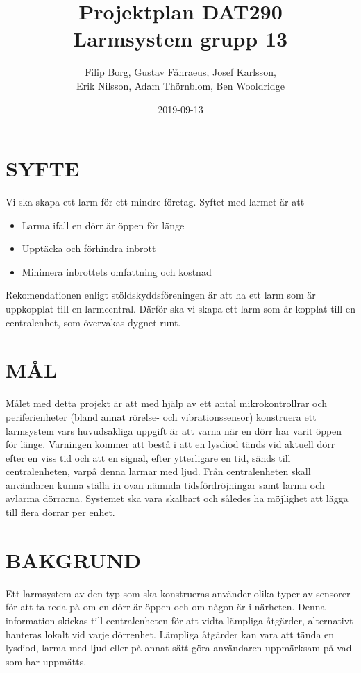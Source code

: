 \documentclass[a4paper]{article}
\title{Projektplan DAT290 \\ \Large Larmsystem grupp 13}
\author{Filip Borg, Gustav Fåhraeus, Josef Karlsson,\\
            Erik Nilsson, Adam Thörnblom, Ben Wooldridge}
\date{2019-09-13}
\begin{document}
\maketitle
{}
\newpage

\tableofcontents
\newpage



\section{SYFTE}
\label{sec:syfte}

Vi ska skapa ett larm för ett mindre företag. Syftet med larmet är att
\begin{itemize}
    \item Larma ifall en dörr är öppen för länge
    \item Upptäcka och förhindra inbrott
    \item Minimera inbrottets omfattning och kostnad

\end{itemize}
Rekomendationen enligt stöldskyddsföreningen är att ha ett larm
som är uppkopplat till en larmcentral. Därför ska vi skapa ett larm som är kopplat till en centralenhet,
 som övervakas dygnet runt.

\section{MÅL}
\label{sec:mål}

Målet med detta projekt är att med hjälp av ett antal mikrokontrollrar och periferienheter (bland annat rörelse- och vibrationssensor) konstruera ett larmsystem vars huvudsakliga uppgift är att varna när en dörr har varit öppen för länge. Varningen kommer att bestå i att en lysdiod tänds vid aktuell dörr efter en viss tid och att en signal, efter ytterligare en tid, sänds till centralenheten, varpå denna larmar med ljud. Från centralenheten skall användaren kunna ställa in ovan nämnda tidsfördröjningar samt larma och avlarma dörrarna. Systemet ska vara skalbart och således ha möjlighet att lägga till flera dörrar per enhet.

\section{BAKGRUND}
\label{sec:bakgrund}

Ett larmsystem av den typ som ska konstrueras använder olika typer av sensorer för att ta reda på om en dörr är öppen och om någon är i närheten. Denna information skickas till centralenheten för att vidta lämpliga åtgärder, alternativt hanteras lokalt vid varje dörrenhet.
Lämpliga åtgärder kan vara att tända en lysdiod, larma med ljud eller på annat sätt göra användaren uppmärksam på vad som har uppmätts.
\end{document}
